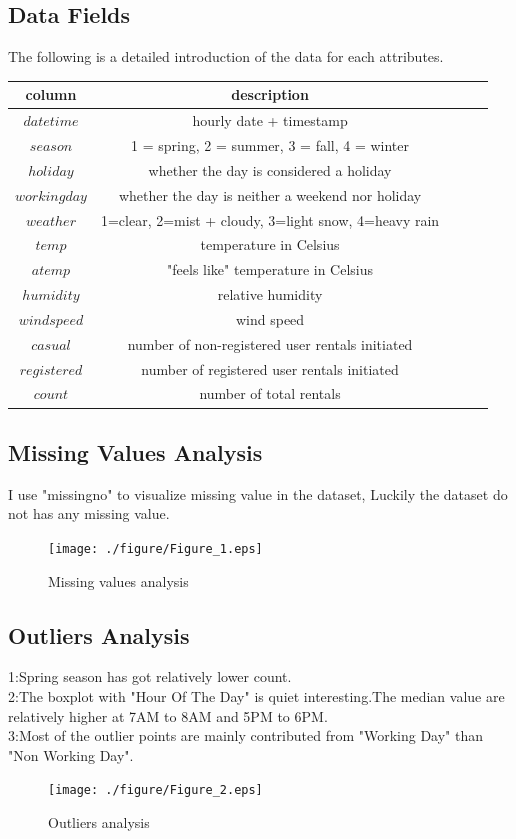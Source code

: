 \subsection{Data Fields}
The following is a detailed introduction of the data for each attributes.\\
\begin{tabular}{c| c c c c }
	\toprule
	\textbf{column} & \textbf{description}  \\
	\midrule
	$datetime$ &  {hourly date + timestamp }\\
	$season$ &  {1 = spring, 2 = summer, 3 = fall, 4 = winter} \\
	$holiday$ &  {whether the day is considered a holiday} \\
	$workingday$ &  {whether the day is neither a weekend nor holiday} \\
	$weather$ &  {1=clear, 2=mist + cloudy, 3=light snow, 4=heavy rain} \\
	$temp$ & {temperature in Celsius} \\
	$atemp$ & {"feels like" temperature in Celsius} \\
	$humidity$ & {relative humidity} \\
	$windspeed$ & {wind speed} \\
	$casual$ & {number of non-registered user rentals initiated} \\
	$registered$ & {number of registered user rentals initiated} \\
	$count$ & {number of total rentals} \\
	\bottomrule
\end{tabular}

\subsection{Missing Values Analysis}
I use "missingno" to visualize missing value in the dataset, Luckily the dataset do not has any missing value.\\
\begin{figure}[htbp]
	\texttt{[image: ./figure/Figure\_1.eps]}
	\caption{Missing values analysis}
\end{figure}

\subsection{Outliers Analysis}
1:Spring season has got relatively lower count. \\
2:The boxplot with "Hour Of The Day" is quiet interesting.The median value are relatively higher at 7AM to 8AM and 5PM to 6PM.\\
3:Most of the outlier points are mainly contributed from "Working Day" than "Non Working Day". 
\begin{figure}[htbp]
	\texttt{[image: ./figure/Figure\_2.eps]}
	\caption{Outliers analysis}
\end{figure}

